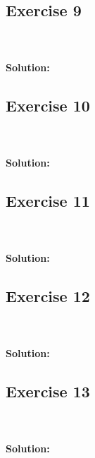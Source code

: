 \documentclass{article}
\begin{document}
\subsection*{Exercise 9}
\\\\
\textbf{Solution:}

\subsection*{Exercise 10}
\\\\
\textbf{Solution:}

\subsection*{Exercise 11}
\\\\
\textbf{Solution:}

\subsection*{Exercise 12}
\\\\
\textbf{Solution:}

\subsection*{Exercise 13}
\\\\
\textbf{Solution:}
\end{document}
